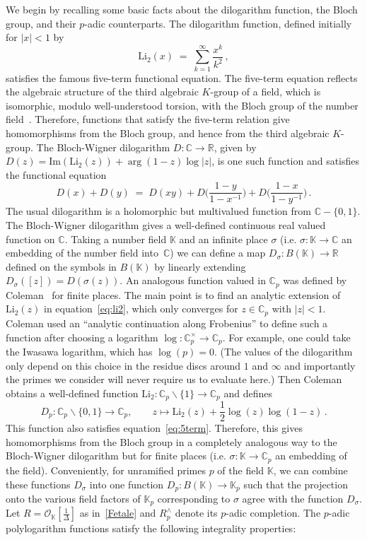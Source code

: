 \documentclass[12pt,reqno]{amsart}
\theoremstyle{definition}
\def\BR{\mathbb R}
\def\BC{\mathbb C}
\def\BK{\mathbb K}
\def\Li{\mathrm{Li}}
\def\Im{\mathrm{Im}}
\def\be{\begin{equation}}
\def\ee{\end{equation}}
\def\calO{\mathcal{O}}
\def\={\;=\;}
\begin{document}
We begin by recalling some basic facts about the dilogarithm function, the Bloch
group, and their $p$-adic counterparts. The dilogarithm function, defined initially
for $|x|<1$ by
\be
\label{eq:li2}
\Li_{2}(x) \= \sum_{k=1}^{\infty} \frac{x^k}{k^2}\,,
\ee
satisfies the famous five-term functional equation. The five-term equation reflects
the algebraic structure of the third algebraic $K$-group of a field, which is
isomorphic, modulo well-understood torsion, with the Bloch group of the number
field~\cite{Bloch,Zagier:dilog}. Therefore, functions that satisfy the five-term
relation give homomorphisms from the Bloch group, and hence from the third algebraic
$K$-group. The Bloch-Wigner dilogarithm $D:\BC\rightarrow\BR$,
given by $D(z)=\Im(\Li_{2}(z))+\arg(1-z)\log|z|$, is one such
function and satisfies the functional equation
\be
\label{eq:5term}
D(x)+D(y) \= D(xy) +D\Big(\frac{1-y}{1-x^{-1}}\Big) +D\Big(\frac{1-x}{1-y^{-1}}\Big)\,.
\ee
The usual dilogarithm is a holomorphic but multivalued function from $\BC-\{0,1\}$.
The Bloch-Wigner dilogarithm gives a well-defined continuous real valued function
on $\BC$. Taking a number field $\BK$ and an infinite place $\sigma$ (i.e.
$\sigma:\BK\rightarrow\BC$ an embedding of the number field into~$\BC$) we can define
a map $D_{\sigma}:B(\BK)\rightarrow\BR$ defined on the symbols in $B(\BK)$ by linearly
extending $D_{\sigma}([z])=D(\sigma(z))$. An analogous function valued in $\BC_p$ was
defined by Coleman~\cite{Coleman} for finite places. The main point is to find an
analytic extension of $\Li_2(z)$ in equation~\eqref{eq:li2}, which only converges for
$z\in\BC_{p}$ with $|z|<1$. Coleman used an ``analytic continuation along Frobenius''
to define such a function after choosing a logarithm
$\log:\BC_{p}^{\times}\rightarrow\BC_p$. For example, one could take
the Iwasawa logarithm, which has $\log(p)=0$. (The values of the dilogarithm only
depend on this
choice in the residue discs around $1$ and $\infty$ and importantly the primes
we consider will never require us to evaluate here.)
Then Coleman obtains a well-defined function
$\Li_2:\BC_p\smallsetminus\{1\}\rightarrow\BC_{p}$ and defines
\be
\label{Dpdef}
D_p:\BC_{p}\smallsetminus\{0,1\}\rightarrow\BC_{p}, \qquad z \mapsto
\Li_2(z)+\frac{1}{2}\log(z)\log(1-z)\,.
\ee
This function also satisfies equation~\eqref{eq:5term}. Therefore, this gives
homomorphisms from the Bloch group in a completely analogous way to the Bloch-Wigner
dilogarithm but for finite places (i.e. $\sigma:\BK\rightarrow\BC_{p}$ an embedding of
the field). Conveniently, for unramified primes $p$ of the field $\BK$, we can combine
these functions $D_{\sigma}$ into one function $D_{p}:B(\BK)\rightarrow\BK_{p}$
such that the projection onto the various field factors of $\BK_{p}$
corresponding to $\sigma$ agree with the function $D_{\sigma}$.
Let $R=\calO_\BK[\tfrac{1}{\Delta}]$ as in~\eqref{Fetale} and $R^\wedge_p$ denote its
$p$-adic completion. The $p$-adic polylogarithm functions satisfy the following
integrality properties:
\end{document}
